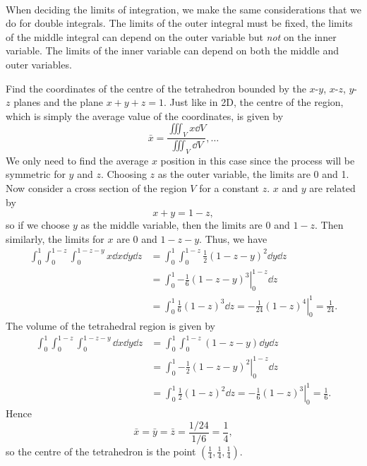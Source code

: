 \documentclass[../multivariate_calculus.tex]{subfiles}
\begin{document}
        \paragraph{}
        When deciding the limits of integration, we make the same considerations that we do for double integrals.
        The limits of the outer integral must be fixed, the limits of the middle integral can depend on the outer variable but \textit{not} on the inner variable.
        The limits of the inner variable can depend on both the middle and outer variables.
        \begin{example}
            Find the coordinates of the centre of the tetrahedron bounded by the $x$-$y$, $x$-$z$, $y$-$z$ planes and the plane $x+y+z=1$.
            Just like in 2D, the centre of the region, which is simply the average value of the coordinates, is given by
            \begin{equation}
                \bar{x}=\frac{\iiint_V x\dd{V}}{\iiint_V \dd{V}},\dots
            \end{equation}
            We only need to find the average $x$ position in this case since the process will be symmetric for $y$ and $z$.
            Choosing $z$ as the outer variable, the limits are 0 and 1.
            Now consider a cross section of the region $V$ for a constant $z$.
            $x$ and $y$ are related by
            \begin{equation}
                x+y=1-z,
            \end{equation}
            so if we choose $y$ as the middle variable, then the limits are 0 and $1-z$.
            Then similarly, the limits for $x$ are 0 and $1-z-y$.
            Thus, we have
            \begin{align}
                \int_0^1\int_0^{1-z}\int_0^{1-z-y}x\dd{x}\dd{y}\dd{z}&=\int_0^1\int_0^{1-z}\frac{1}{2}(1-z-y)^2\dd{y}\dd{z}\\
                &=\int_0^1\left.-\frac{1}{6}(1-z-y)^3\right|_0^{1-z}\dd{z}\\
                &=\int_0^1\frac{1}{6}(1-z)^3\dd{z}=\left.-\frac{1}{24}(1-z)^4\right|_0^1=\frac{1}{24}.
            \end{align}
            The volume of the tetrahedral region is given by
            \begin{align}
                \int_0^1\int_0^{1-z}\int_0^{1-z-y}\dd{x}\dd{y}\dd{z}&=\int_0^1\int_0^{1-z}(1-z-y)\dd{y}\dd{z}\\
                &=\int_0^1\left.-\frac{1}{2}(1-z-y)^2\right|_0^{1-z}\dd{z}\\
                &=\int_0^1\frac{1}{2}(1-z)^2\dd{z}=\left.-\frac{1}{6}(1-z)^3\right|_0^1=\frac{1}{6}.
            \end{align}
            Hence
            \begin{equation}
                \bar{x}=\bar{y}=\bar{z}=\frac{1/24}{1/6}=\frac{1}{4},
            \end{equation}
            so the centre of the tetrahedron is the point $\left(\frac{1}{4},\frac{1}{4},\frac{1}{4}\right)$.
        \end{example}
\end{document}
